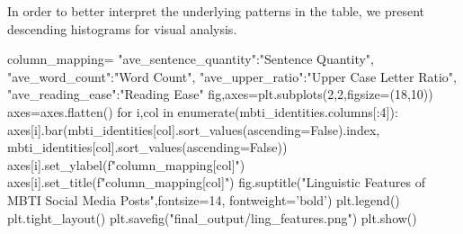 \documentclass[12pt]{article}
\numberwithin{figure}{section}  %
\begin{document}
	In order to better interpret the underlying patterns in the table, we
	present descending histograms for visual analysis.
	\begin{python}
column_mapping={
    "ave_sentence_quantity":"Sentence Quantity",
    "ave_word_count":"Word Count",
    "ave_upper_ratio":"Upper Case Letter Ratio",
    "ave_reading_ease":"Reading Ease"
}
fig,axes=plt.subplots(2,2,figsize=(18,10))
axes=axes.flatten()
for i,col in enumerate(mbti_identities.columns[:4]):
    axes[i].bar(mbti_identities[col].sort_values(ascending=False).index, mbti_identities[col].sort_values(ascending=False))
    axes[i].set_ylabel(f"{column_mapping[col]}")
    axes[i].set_title(f"{column_mapping[col]}")
fig.suptitle("Linguistic Features of MBTI Social Media Posts",fontsize=14, fontweight='bold')
plt.legend()
plt.tight_layout()
plt.savefig("final_output/ling_features.png")
plt.show()
	\end{python}
\begin{figure}[H]
    \centering
\end{figure}
\end{document}
